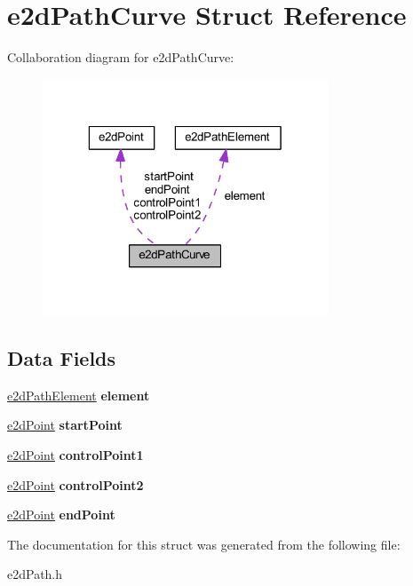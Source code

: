 \hypertarget{structe2dPathCurve}{\section{e2d\-Path\-Curve Struct Reference}
\label{structe2dPathCurve}
}


Collaboration diagram for e2d\-Path\-Curve\-:
\nopagebreak
\begin{figure}[H]
\begin{center}
\leavevmode
\includegraphics[width=241pt]{structe2dPathCurve__coll__graph}
\end{center}
\end{figure}
\subsection*{Data Fields}
\begin{DoxyCompactItemize}
\item 
\hypertarget{structe2dPathCurve_a88e514266530010a1a3b08198b3cc763}{\hyperlink{structe2dPathElement}{e2d\-Path\-Element} {\bfseries element}}\label{structe2dPathCurve_a88e514266530010a1a3b08198b3cc763}

\item 
\hypertarget{structe2dPathCurve_a96868a222a14861eb6e64214328c6159}{\hyperlink{structe2dPoint}{e2d\-Point} {\bfseries start\-Point}}\label{structe2dPathCurve_a96868a222a14861eb6e64214328c6159}

\item 
\hypertarget{structe2dPathCurve_a5fe58a06185a33704c2cc77c8a58fb0d}{\hyperlink{structe2dPoint}{e2d\-Point} {\bfseries control\-Point1}}\label{structe2dPathCurve_a5fe58a06185a33704c2cc77c8a58fb0d}

\item 
\hypertarget{structe2dPathCurve_a929324aa1e3527d71e312e5f80cb24db}{\hyperlink{structe2dPoint}{e2d\-Point} {\bfseries control\-Point2}}\label{structe2dPathCurve_a929324aa1e3527d71e312e5f80cb24db}

\item 
\hypertarget{structe2dPathCurve_a0ae59a21d141722d36c0ebc740587f9d}{\hyperlink{structe2dPoint}{e2d\-Point} {\bfseries end\-Point}}\label{structe2dPathCurve_a0ae59a21d141722d36c0ebc740587f9d}

\end{DoxyCompactItemize}


The documentation for this struct was generated from the following file\-:\begin{DoxyCompactItemize}
\item 
e2d\-Path.\-h\end{DoxyCompactItemize}

